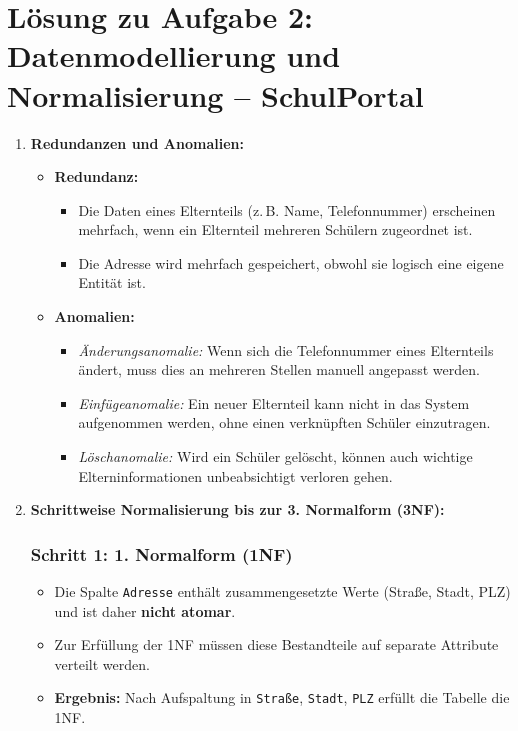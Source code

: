 \documentclass[a4paper,12pt]{article}
\begin{document}
	\vspace{2em}
	
\section*{Lösung zu Aufgabe 2: Datenmodellierung und Normalisierung – SchulPortal}

\begin{enumerate}
	\item \textbf{Redundanzen und Anomalien:}
	
	\begin{itemize}
		\item \textbf{Redundanz:} 
		\begin{itemize}
			\item Die Daten eines Elternteils (z.\,B. Name, Telefonnummer) erscheinen mehrfach, wenn ein Elternteil mehreren Schülern zugeordnet ist.
			\item Die Adresse wird mehrfach gespeichert, obwohl sie logisch eine eigene Entität ist.
		\end{itemize}
		
		\item \textbf{Anomalien:}
		\begin{itemize}
			\item \emph{Änderungsanomalie:} Wenn sich die Telefonnummer eines Elternteils ändert, muss dies an mehreren Stellen manuell angepasst werden.
			\item \emph{Einfügeanomalie:} Ein neuer Elternteil kann nicht in das System aufgenommen werden, ohne einen verknüpften Schüler einzutragen.
			\item \emph{Löschanomalie:} Wird ein Schüler gelöscht, können auch wichtige Elterninformationen unbeabsichtigt verloren gehen.
		\end{itemize}
	\end{itemize}
	
	\vspace{1em}
	
	\item \textbf{Schrittweise Normalisierung bis zur 3. Normalform (3NF):}
	
	\subsubsection*{Schritt 1: 1. Normalform (1NF)}
	\begin{itemize}
		\item Die Spalte \texttt{Adresse} enthält zusammengesetzte Werte (Straße, Stadt, PLZ) und ist daher \textbf{nicht atomar}.
		\item Zur Erfüllung der 1NF müssen diese Bestandteile auf separate Attribute verteilt werden.
		\item \textbf{Ergebnis:} Nach Aufspaltung in \texttt{Straße}, \texttt{Stadt}, \texttt{PLZ} erfüllt die Tabelle die 1NF.
	\end{itemize}
	

\end{enumerate}
\end{document}
